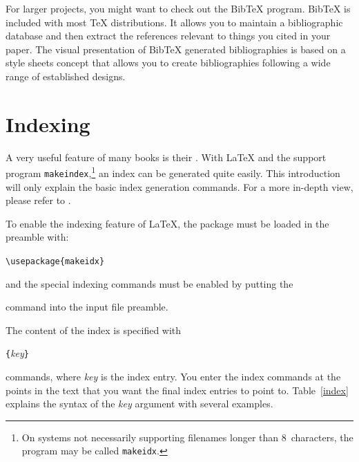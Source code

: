 \thispagestyle{fancyplain}

\newpage

For larger projects, you might want to check out the Bib\TeX{}
program. Bib\TeX{} is included with most \TeX{} distributions. It
allows you to maintain a bibliographic database and then extract the
references relevant to things you cited in your paper. The visual
presentation of Bib\TeX{} generated bibliographies is based on a style
sheets concept that allows you to create bibliographies following
a wide range of established designs.

\section{Indexing} \label{sec:indexing}
A very useful feature of many books is their . With \LaTeX{}
and the support program \texttt{makeindex},\footnote{On systems not
  necessarily supporting
  filenames longer than 8~characters, the program may be called
  \texttt{makeidx}.} an index can be generated quite easily.  This
introduction will only explain the basic index generation commands.
For a more in-depth view, please refer to \companion.   

To enable the indexing feature of \LaTeX{}, the  package
must be loaded in the preamble with:
\begin{lscommand}
\verb|\usepackage{makeidx}|
\end{lscommand}
\noindent and the special indexing commands must be enabled by putting 
the
\begin{lscommand}
\end{lscommand}
\noindent command into the input file preamble.

The content of the index is specified with
\begin{lscommand}
  \verb|{|\emph{key}\verb|}|
\end{lscommand}
\noindent commands, where \emph{key} is the index entry. You enter the
index commands at the points in the text that you want the final index
entries to point to.  Table~\ref{index} explains the syntax of the
\emph{key} argument with several examples.

